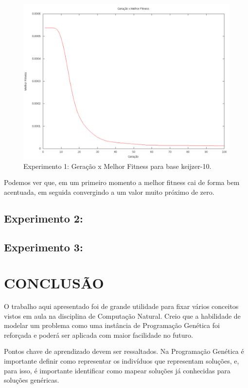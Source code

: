 \documentclass[12pt]{article}
\begin{document}
\begin{figure}[ht]
  \centering
  \includegraphics[width=1\textwidth]{exp1.png}
  \caption{Experimento 1: Geração x Melhor Fitness para base keijzer-10.}
  \label{fig:exp1}
\end{figure}
  
Podemos ver que, em um primeiro momento a melhor fitness cai de forma bem acentuada,
em seguida convergindo a um valor muito próximo de zero.

\subsection{Experimento 2: }

\subsection{Experimento 3: }

\section{CONCLUSÃO}

O trabalho aqui apresentado foi de grande utilidade para fixar vários conceitos vistos em aula
na disciplina de Computação Natural. Creio que a habilidade de modelar um problema como uma
instância de Programação Genética foi reforçada e poderá ser aplicada com maior facilidade
no futuro.

Pontos chave de aprendizado devem ser ressaltados. Na Programação Genética é importante
definir como representar os indivíduos que representam soluções, e, para isso, é importante
identificar como mapear soluções já conhecidas para soluções genéricas.
\end{document}
